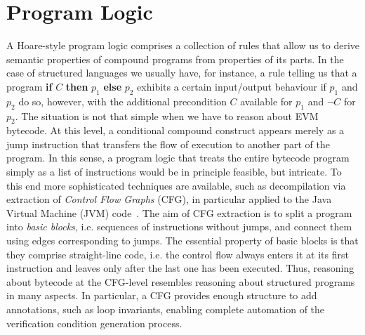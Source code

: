 \documentclass[sigplan,10pt]{acmart}\settopmatter{printfolios=true,printccs=false,printacmref=false}
\begin{document}
\section{Program Logic}
\label{sec:logic}
A Hoare-style program logic comprises a collection of rules that allow us to derive semantic properties 
of compound programs from properties of its parts. In the case of structured languages 
we usually have, for instance, a rule telling us that a program \textbf{if} $C$ \textbf{then} $p_1$ \textbf{else} $p_2$
exhibits a certain input/output behaviour if $p_1$ and $p_2$ do so, however, with the additional precondition $C$ 
available for $p_1$ and $\neg C$ for $p_2$.
The situation is not that simple when we have to reason about EVM bytecode.
At this level, a conditional compound construct
appears merely as a jump instruction that transfers the flow of execution
to another part of the program.
In this sense, a program logic that treats the entire bytecode program simply as a list of instructions
would be in principle feasible, but intricate. 
%
To this end more sophisticated techniques are available, such as decompilation via extraction of 
\emph{Control Flow Graphs} (CFG), in particular applied to the Java Virtual Machine (JVM) code~\cite{zhao99}.
The aim of CFG extraction is to split a program into \emph{basic blocks}, i.e. sequences of
instructions without jumps, and connect them
using edges corresponding to jumps.
The essential property of basic blocks is that
they comprise straight-line code, i.e. the control flow always enters it at its first instruction
and leaves only after the last one has been executed.
Thus, reasoning about bytecode at the CFG-level resembles reasoning about structured programs
in many aspects.
In particular, a CFG provides enough structure to add annotations,
such as loop invariants, enabling complete automation of the verification condition generation process.
\end{document}
